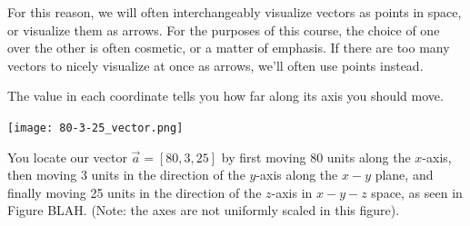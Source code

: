 \documentclass{ximera}
\begin{document}
\begin{remark}
\begin{description}
\begin{definition}
      \begin{remark}
      
      For this reason, we will often interchangeably visualize vectors as points in space, or visualize them as arrows. For the purposes of this course, the choice of one over the other is often cosmetic, or a matter of emphasis. If there are too many vectors to nicely visualize at once as arrows, we'll often use points instead.

    \end{remark}
    \end{definition}

    The value in each coordinate tells you how far along its axis you should move.


    \begin{center}
    \texttt{[image: 80-3-25\_vector.png]}
    \end{center}

    You locate our vector $\vec{a}=[80, 3, 25]$ by first moving 80 units along the $x$-axis, then moving 3 units in the direction of the $y$-axis along the $x-y$ plane, and finally moving 25 units in the direction of the $z$-axis in $x-y-z$ space, as seen in Figure BLAH. (Note: the axes are not uniformly scaled in this figure).


\end{description} 
\end{remark}
\end{document}
